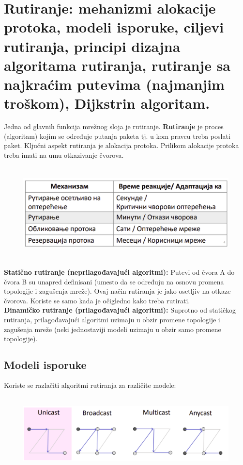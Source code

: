 \documentclass[a4paper]{article}
\begin{document}
\section{Rutiranje: mehanizmi alokacije protoka, modeli isporuke, ciljevi rutiranja, principi
        dizajna algoritama rutiranja, rutiranje sa najkraćim putevima (najmanjim troškom),
        Dijkstrin algoritam. }
    Jedna od glavnih funkcija mrežnog sloja je rutiranje. \textbf{Rutiranje} je proces (algoritam)
    kojim se određuje putanja paketa tj. u kom pravcu treba poslati paket. Ključni aspekt 
    rutiranja je alokacija protoka. Prilikom alokacije protoka treba imati na umu 
    otkazivanje čvorova. 
    \begin{figure}[H]
        \begin{center}
            \includegraphics[width=120mm,height=50mm]{Slike/rutiranje1.png}
        \end{center}
    \end{figure}
    \textbf{Statično rutiranje (neprilagođavajući algoritmi):} Putevi od čvora A do čvora B su unapred
    definisani (umesto da se određuju na osnovu promena topologije i zagušenja mreže). Ovaj način 
    rutiranja je jako osetljiv na otkaze čvorova. Koriste se samo kada je očigledno kako treba 
    rutirati.\\
    \indent \textbf{Dinamičko rutiranje (prilagođavajući algoritmi):} Suprotno od statičkog
    rutiranja, prilagođavajući algoritmi uzimaju u obzir promene topologije i zagušenja mreže 
    (neki jednostaviji modeli uzimaju u obzir samo promene topologije). 

    \subsection{Modeli isporuke}
    Koriste se razlačiti algoritmi rutiranja za različite modele:
    \begin{figure}[H]
        \begin{center}
            \includegraphics[width=120mm,height=40mm]{Slike/rutiranje2.png}
        \end{center}
    \end{figure}
\end{document}
